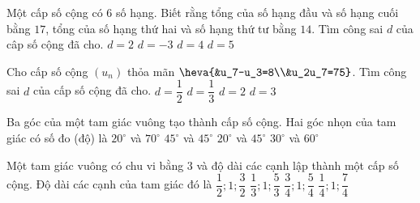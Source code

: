 \begin{ex}%
	Một cấp số cộng có $6$ số hạng. Biết rằng tổng của số hạng đầu và số hạng cuối bằng $17$, tổng
	của số hạng thứ hai và số hạng thứ tư bằng $14$. Tìm công sai $d$ của câp số cộng đã cho.
	\choice
	{$d=2$}
	{\True $d=-3$}
	{$d=4$}
	{$d=5$}
\end{ex}
\begin{ex}%
	Cho cấp số cộng $\left(u_n\right)$ thỏa mãn $\heva{&u_7-u_3=8\\&u_2u_7=75}$. Tìm công sai $d$ của cấp số cộng đã cho.
	\choice
	{$d=\dfrac{1}{2}$}
	{$d=\dfrac{1}{3}$}
	{\True $d=2$}
	{$d=3$}
\end{ex}
\begin{ex}%
	Ba góc của một tam giác vuông tạo thành cấp số cộng. Hai góc nhọn của tam giác có số đo
	(độ) là
	\choice
	{$20^\circ$ và $70^\circ$}
	{$45^\circ$ và $45^\circ$}
	{$20^\circ$ và $45^\circ$}
	{\True $30^\circ$ và $60^\circ$}
\end{ex}
\begin{ex}%
	Một tam giác vuông có chu vi bằng $3$ và độ dài các cạnh lập thành một cấp số cộng. Độ dài các
	cạnh của tam giác đó là
	\choice
	{$\dfrac{1}{2};1;\dfrac{3}{2}$}
	{$\dfrac{1}{3};1;\dfrac{5}{3}$}
	{\True $\dfrac{3}{4};1;\dfrac{5}{4}$}
	{$\dfrac{1}{4};1;\dfrac{7}{4}$}
\end{ex}
